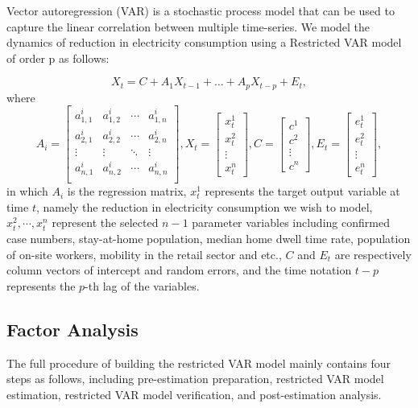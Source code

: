 \documentclass[10pt]{article}
\numberwithin{equation}{section}
\numberwithin{table}{section}
\numberwithin{figure}{section}
\begin{document}
Vector autoregression (VAR)\cite{var} is a stochastic process model that can be used to capture the linear correlation between multiple time-series. We model the dynamics of reduction in electricity consumption using a Restricted VAR model of order p as follows:

\begin{equation}
  X_t=C+A_1X_{t-1}+\dots+A_pX_{t-p}+E_t,
\end{equation}
where
\begin{equation}
  A_i=
  \begin{bmatrix}
  a_{1,1}^i & a_{1,2}^i & \cdots & a_{1,n}^i\\
  a_{2,1}^i & a_{2,2}^i & \cdots & a_{2,n}^i\\
  \vdots & \vdots & \ddots & \vdots \\
  a_{n,1}^i & a_{n,2}^i & \cdots & a_{n,n}^i\\
  \end{bmatrix}
  ,X_t=
  \begin{bmatrix}
    x_t^1\\x_t^2\\\vdots\\x_t^n
  \end{bmatrix},
  C=
  \begin{bmatrix}
    c^1\\c^2\\\vdots\\c^n
  \end{bmatrix},
  E_t=
  \begin{bmatrix}
    e_t^1\\e_t^2\\\vdots\\e_t^n
  \end{bmatrix},
\end{equation}
in which $A_i$ is the regression matrix, $x_t^1$ represents the target output variable at time $t$, namely the reduction in electricity consumption we wish to model, $x_t^2,\cdots,x_t^n$ represent the selected $n-1$ parameter variables including confirmed case numbers, stay-at-home population, median home dwell time rate, population of on-site workers, mobility in the retail sector and etc., $C$ and $E_t$ are respectively column vectors of intercept and random errors, and the time notation $t-p$ represents the $p$-th lag of the variables.

\subsection{Factor Analysis}
The full procedure of building the restricted VAR model mainly contains four steps as follows, including pre-estimation preparation, restricted VAR model estimation, restricted VAR model verification, and post-estimation analysis.
\end{document}
